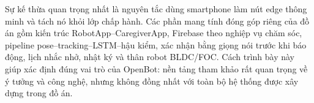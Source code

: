 Sự kế thừa quan trọng nhất là nguyên tắc dùng smartphone làm nút edge thông minh và tách nó khỏi lớp chấp hành. Các phần mang tính đóng góp riêng của đồ án gồm kiến trúc RobotApp--CaregiverApp, Firebase theo nghiệp vụ chăm sóc, pipeline pose--tracking--LSTM--hậu kiểm, xác nhận bằng giọng nói trước khi báo động, lịch nhắc nhở, nhật ký và thân robot BLDC/FOC. Cách trình bày này giúp xác định đúng vai trò của OpenBot: nền tảng tham khảo rất quan trọng về ý tưởng và công nghệ, nhưng không đồng nhất với toàn bộ hệ thống được xây dựng trong đồ án.
\fi












